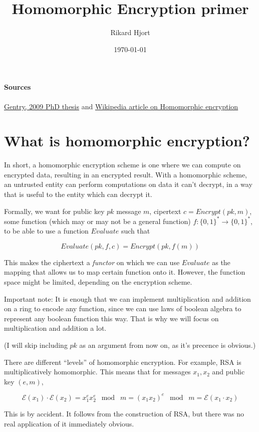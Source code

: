 \documentclass{article}
\title{Homomorphic Encryption primer}
\author{Rikard Hjort}
\date{\today}
\begin{document}
\maketitle
\paragraph{Sources} \href{https://crypto.stanford.edu/craig/craig-thesis.pdf}{Gentry, 2009 PhD thesis} and \href{https://en.wikipedia.org/wiki/Homomorphic_encryption}{Wikipedia article on Homomorphic encryption}

\section{What is homomorphic encryption?}

In short, a homomorphic encryption scheme is one where we can compute on encrypted data, resulting in an encrypted result. With a homomorphic scheme, an untrusted entity can perform computations on data it can't decrypt, in a way that is useful to the entity which can decrypt it.

Formally, we want for public key $pk$ message $m$, cipertext $c = Encrypt(pk, m)$, some function (which may or may not be a general function) $f: \{0, 1\}^* \rightarrow \{0,1\}^*$, to be able to use a function $Evaluate$ such that

$$ Evaluate(pk, f, c) = Encrypt(pk, f(m))$$

This makes the ciphertext a \textit{functor} on which we can use $Evaluate$ as the mapping that allows us to map certain function onto it. However, the function space might be limited, depending on the encryption scheme.

Important note: It is enough that we can implement multiplication and addition on a ring to encode any function, since we can use laws of boolean algebra to represent any boolean function this way. That is why we will focus on multiplication and addition a lot.

(I will skip including $pk$ as an argument from now on, as it's precence is obvious.)

There are different ``levels'' of homomorphic encryption. For example, RSA is multiplicatively homomorphic. This means that for messages $x_1, x_2$ and public key $(e, m)$, 

$$ \mathcal{E}(x_1) \cdot \mathcal{E}(x_2) = x_1^e x_2^e \;\bmod\; m = (x_1x_2)^e \;\bmod\; m = \mathcal{E}(x_1 \cdot x_2)$$

\noindent This is by accident. It follows from the construction of RSA, but there was no real application of it immediately obvious.
\end{document}

